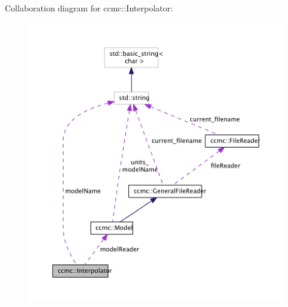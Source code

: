 Collaboration diagram for ccmc\-:\-:Interpolator\-:\nopagebreak
\begin{figure}[H]
\begin{center}
\leavevmode
\includegraphics[width=350pt]{classccmc_1_1_interpolator__coll__graph}
\end{center}
\end{figure}
